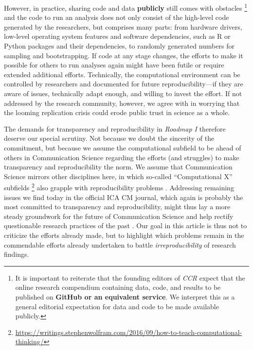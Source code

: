 However, in practice, sharing code and data \textbf{publicly} still comes with obstacles \footnote{It is important to reiterate that the founding editors of \textit{CCR} expect that the online research compendium containing data, code, and results to be published on \textbf{GitHub or an equivalent service}. We interpret this as a general editorial expectation for data and code to be made available publicly. } and the code to run an analysis does not only consist of the high-level code generated by the researchers, but comprises many parts:
from hardware drivers, low-level operating system features and software dependencies, such as R or Python packages and their dependencies, to randomly generated numbers for sampling and bootstrapping.
If code at any stage changes, the efforts to make it possible for others to run analyses again might have been futile or require extended additional efforts.
Technically, the computational environment can be controlled by researchers and documented for future reproducibility---if they are aware of issues, technically adapt enough, and willing to invest the effort.
If not addressed by the research community, however, we agree with \textcite{mede:2020} in worrying that the looming replication crisis could erode public trust in science as a whole.

The demands for transparency and reproducibility in \textit{Roadmap I} therefore deserve our special scrutiny.
Not because we doubt the sincerity of the commitment, but because we assume the computational subfield to be ahead of others in Communication Science regarding the efforts (and struggles) to make transparency and reproducibility the norm.
We assume that Communication Science mirrors other disciplines here, in which so-called ``Computational X'' subfields \footnote{\url{https://writings.stephenwolfram.com/2016/09/how-to-teach-computational-thinking/}} also grapple with reproducibility problems \parencite[e.g.][]{hothorn:2011:C, hutson:2018:M, ioannidis:2009:R}.
Addressing remaining issues we find today in the official ICA CM journal, which again is probably the most committed to transparency and reproducibility, might thus lay a more steady groundwork for the future of Communication Science and help rectify questionable research practices of the past \parencite[]{bakker:2021:QOR,matthes:2015:QRP}.
Our goal in this article is thus not to criticize the efforts already made, but to highlight which problems remain in the commendable efforts already undertaken to battle \emph{irreproducibility} of research findings.

